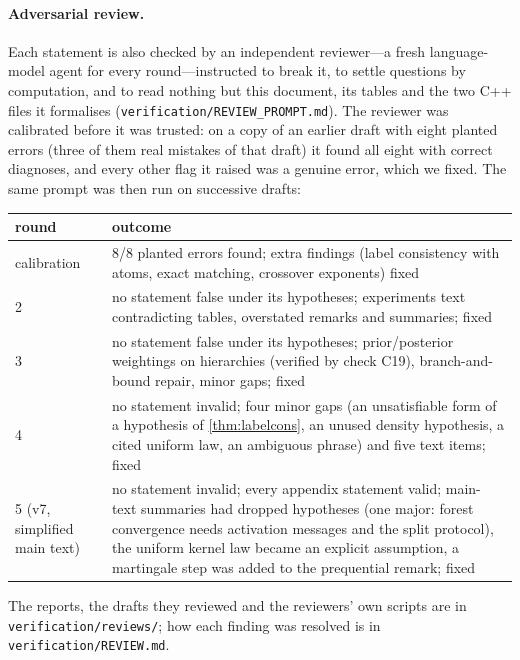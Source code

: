 \documentclass[11pt]{article}
\theoremstyle{definition}
\theoremstyle{remark}
\begin{document}
\paragraph{Adversarial review.}
Each statement is also checked by an independent reviewer---a fresh language-model agent
for every round---instructed to break it, to settle questions by computation, and to
read nothing but this document, its tables and the two C++ files it formalises
(\nolinkurl{verification/REVIEW_PROMPT.md}).  The reviewer was calibrated before it was
trusted: on a copy of an earlier draft with eight planted errors (three of them real
mistakes of that draft) it found all eight with correct diagnoses, and every other flag it
raised was a genuine error, which we fixed.  The same prompt was then run on successive
drafts:

\begin{center}\small
\begin{tabular}{@{}lp{11.5cm}@{}}\toprule
round & outcome\\\midrule
calibration & 8/8 planted errors found; extra findings (label consistency with atoms, exact matching, crossover exponents) fixed\\
2 & no statement false under its hypotheses; experiments text contradicting tables, overstated remarks and summaries; fixed\\
3 & no statement false under its hypotheses; prior/posterior weightings on hierarchies (verified by check C19), branch-and-bound repair, minor gaps; fixed\\
4 & no statement invalid; four minor gaps (an unsatisfiable form of a hypothesis of \cref{thm:labelcons}, an unused density hypothesis, a cited uniform law, an ambiguous phrase) and five text items; fixed\\
5 (v7, simplified main text) & no statement invalid; every appendix statement valid; main-text summaries had dropped hypotheses (one major: forest convergence needs activation messages and the split protocol), the uniform kernel law became an explicit assumption, a martingale step was added to the prequential remark; fixed\\
\bottomrule
\end{tabular}
\end{center}

\noindent The reports, the drafts they reviewed and the reviewers' own scripts are in
\texttt{verification/reviews/}; how each finding was resolved is in
\texttt{verification/REVIEW.md}.



\end{document}
